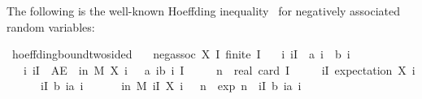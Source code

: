 The following is the well-known Hoeffding inequality~\cite{hoeffding1963} for negatively associated random variables:
\begin{isabelle_cm}
\isamarkupfalse%
\ hoeffding{\isacharunderscore}{\kern0pt}bound{\isacharunderscore}{\kern0pt}two{\isacharunderscore}{\kern0pt}sided{\isacharcolon}{\kern0pt}\isanewline
\ \ \ {\isacartoucheopen}neg{\isacharunderscore}{\kern0pt}assoc\ X\ I{\isacartoucheclose}\ {\isacartoucheopen}finite\ I{\isacartoucheclose}\isanewline
\ \ \ {\isacartoucheopen}{\isasymAnd}i{\isachardot}{\kern0pt}\ i{\isasymin}I\ {\isasymLongrightarrow}\ a\ i\ {\isasymle}\ b\ i{\isacartoucheclose}\isanewline
\ \ \ {\isacartoucheopen}{\isasymAnd}i{\isachardot}{\kern0pt}\ i{\isasymin}I\ {\isasymLongrightarrow}\ AE\ {\isasymomega}\ in\ M{\isachardot}{\kern0pt}\ X\ i\ {\isasymomega}\ {\isasymin}\ {\isacharbraceleft}{\kern0pt}a\ i{\isachardot}{\kern0pt}{\isachardot}{\kern0pt}b\ i{\isacharbraceright}{\kern0pt}{\isacartoucheclose}\ {\isacartoucheopen}I\ {\isasymnoteq}\ {\isacharbraceleft}{\kern0pt}{\isacharbraceright}{\kern0pt}{\isacartoucheclose}\isanewline
\ \ \ {\isacartoucheopen}n\ {\isasymequiv}\ real\ {\isacharparenleft}{\kern0pt}card\ I{\isacharparenright}{\kern0pt}{\isacartoucheclose}\isanewline
\ \ \ {\isacartoucheopen}{\isasymmu}\ {\isasymequiv}\ {\isacharparenleft}{\kern0pt}{\isasymSum}i{\isasymin}I{\isachardot}{\kern0pt}\ expectation\ {\isacharparenleft}{\kern0pt}X\ i{\isacharparenright}{\kern0pt}{\isacharparenright}{\kern0pt}{\isacartoucheclose}\isanewline
\ \ \ {\isacartoucheopen}{\isasymdelta}\ {\isasymge}\ {}{\isacartoucheclose}\ {\isacartoucheopen}{\isacharparenleft}{\kern0pt}{\isasymSum}i{\isasymin}I{\isachardot}{\kern0pt}\ {\isacharparenleft}{\kern0pt}b\ i{\isacharminus}{\kern0pt}a\ i{\isacharparenright}\ {\isachargreater}{\kern0pt}\ {}{\isacartoucheclose}\isanewline
\ \ \ {\isacartoucheopen}{\isasymP}{\isacharparenleft}{\kern0pt}{\isasymomega}\ in\ M{\isachardot}{\kern0pt}\ {\isasymbar}{\isacharparenleft}{\kern0pt}{\isasymSum}i{\isasymin}I{\isachardot}{\kern0pt}\ X\ i\ {\isasymomega}{\isacharparenright}{\kern0pt}{\isacharminus}{\kern0pt}{\isasymmu}{\isasymbar}\ {\isasymge}\ {\isasymdelta}{\isacharasterisk}{\kern0pt}n{\isacharparenright}{\kern0pt}\ {\isasymle}\ {}{\isacharasterisk}{\kern0pt}exp\ {\isacharparenleft}{\kern0pt}{\isacharminus}{\kern0pt}{}{\isacharasterisk}{\kern0pt}{\isacharparenleft}{\kern0pt}n{\isacharasterisk}{\kern0pt}{\isasymdelta}{\isacharparenright}{\kern0pt}\ {\isacharslash}{\kern0pt}\ {\isacharparenleft}{\kern0pt}{\isasymSum}i{\isasymin}I{\isachardot}{\kern0pt}\ {\isacharparenleft}{\kern0pt}b\ i{\isacharminus}{\kern0pt}a\ i{\isacharparenright}\end{isabelle_cm}


